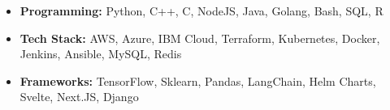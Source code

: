 \begin{itemize}[leftmargin=9pt,label=]
  \item \textbf{Programming:}
    Python, C++, C, NodeJS, Java, Golang, Bash, SQL, R
  \item \textbf{Tech Stack:}
    AWS,
    Azure,
    IBM Cloud,
    Terraform,
    Kubernetes,
    Docker,
    Jenkins,
    Ansible,
    MySQL,
    Redis
  \item \textbf{Frameworks:}
    TensorFlow,
    Sklearn,
    Pandas,
    LangChain,
    Helm Charts,
    Svelte,
    Next.JS,
    Django
\end{itemize}

\vspace{0.1cm} \par
